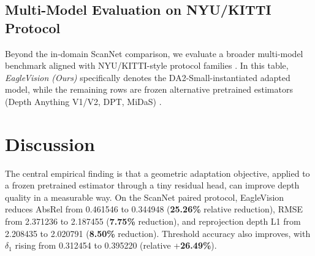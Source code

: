\documentclass{article}
\begin{document}
\subsection{Multi-Model Evaluation on NYU/KITTI Protocol}
Beyond the in-domain ScanNet comparison, we evaluate a broader multi-model benchmark aligned with NYU/KITTI-style protocol families \cite{silberman2012nyu,geiger2012kitti,eigen2014depth}. In this table, \emph{EagleVision (Ours)} specifically denotes the DA2-Small-instantiated adapted model, while the remaining rows are frozen alternative pretrained estimators (Depth Anything V1/V2, DPT, MiDaS) \cite{yang2024depthanything,yang2024depthanythingv2,ranftl2021dpt,ranftl2022midas}.

\begin{table}[t]
\caption{Multi-model NYU evaluation summary (150 validation samples).}
\label{tab:nyu_multimodel}
\centering
\small
{}
\end{table}

\section{Discussion}
The central empirical finding is that a geometric adaptation objective, applied to a frozen pretrained estimator through a tiny residual head, can improve depth quality in a measurable way. On the ScanNet paired protocol, EagleVision reduces AbsRel from 0.461546 to 0.344948 (\textbf{25.26\%} relative reduction), RMSE from 2.371236 to 2.187455 (\textbf{7.75\%} reduction), and reprojection depth L1 from 2.208435 to 2.020791 (\textbf{8.50\%} reduction). Threshold accuracy also improves, with $\delta_1$ rising from 0.312454 to 0.395220 (relative +\textbf{26.49\%}).
\end{document}

